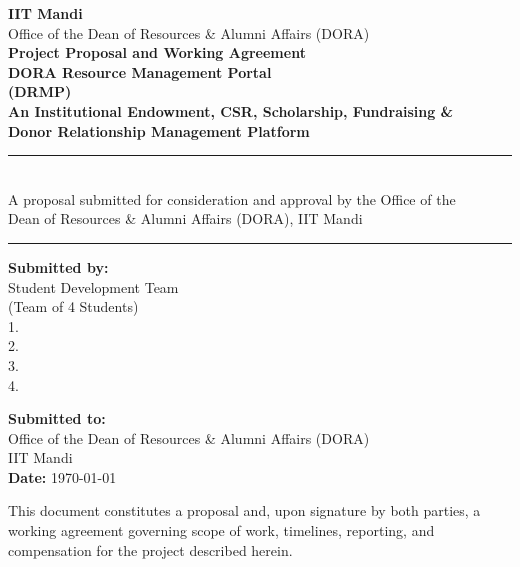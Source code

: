 \documentclass[11pt]{article}
\begin{document}
\begin{titlepage}
\thispagestyle{empty}
\begin{center}
\vspace*{1.0cm}
{\large\bfseries IIT Mandi}\\[4pt]
{\normalsize Office of the Dean of Resources \& Alumni Affairs (DORA)}\\[1.8cm]
{\Large\bfseries Project Proposal and Working Agreement}\\[10pt]
{\huge\bfseries DORA Resource Management Portal}\\[6pt]
{\Large\bfseries (DRMP)}\\[10pt]
{\large\bfseries An Institutional Endowment, CSR, Scholarship, Fundraising \&\\ Donor Relationship Management Platform}\\[1.2cm]
\rule{0.85\textwidth}{0.4pt}\\[10pt]
{\normalsize A proposal submitted for consideration and approval by the Office of the\\ Dean of Resources \& Alumni Affairs (DORA), IIT Mandi}\\[10pt]
\rule{0.85\textwidth}{0.4pt}
\vspace{1.2cm}

\begin{minipage}[t]{0.48\textwidth}
\textbf{Submitted by:}\\[4pt]
Student Development Team\\
(Team of 4 Students)\\[6pt]
1. \underline{\hspace{4.2cm}}\\[4pt]
2. \underline{\hspace{4.2cm}}\\[4pt]
3. \underline{\hspace{4.2cm}}\\[4pt]
4. \underline{\hspace{4.2cm}}
\end{minipage}
\hfill
\begin{minipage}[t]{0.48\textwidth}
\textbf{Submitted to:}\\[4pt]
Office of the Dean of Resources \& Alumni Affairs (DORA)\\
{}IIT Mandi\\[6pt]
\textbf{Date:} \today
\end{minipage}

\vfill
{\small This document constitutes a proposal and, upon signature by both parties, a working agreement governing scope of work, timelines, reporting, and compensation for the project described herein.}
\end{center}
\end{titlepage}
\end{document}
